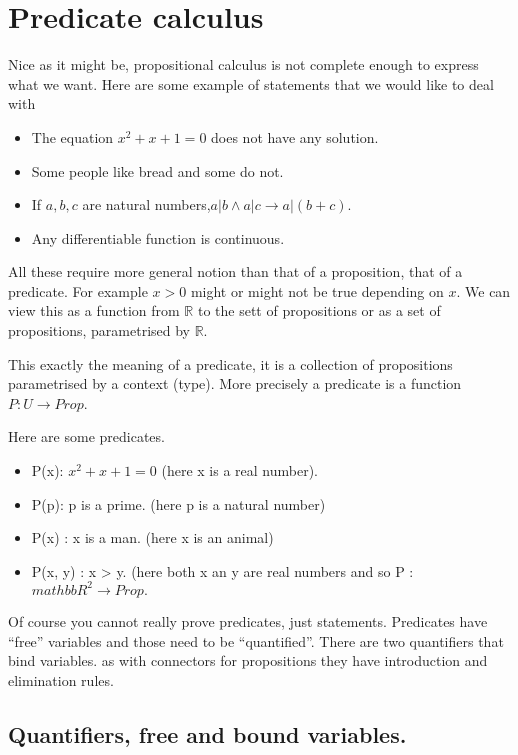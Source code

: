 \section{Predicate calculus}\label{sec:predicatecalculus}

Nice as it might be, propositional calculus is not complete enough to express what we want. Here are some example of statements that we would like to deal with
\begin{itemize}
\item The equation $x^2+x+1=0$ does not have any solution.
\item Some people like bread and some do not.
\item If $a,b, c$ are natural numbers,$a|b \land a | c \rightarrow a | (b+c)$.
\item Any differentiable function is continuous.
\end{itemize}

All these require more general notion than that of a proposition, that of a predicate. 
For example $x>0$ might or might not be true depending on $x$. We can view this as a function from $\mathbb{R}$ to the sett of propositions or as a set of propositions, parametrised by $\mathbb{R}$. 

This exactly the meaning of a predicate, it is a collection of propositions parametrised by a context (type). More precisely a predicate is a function $P: U \rightarrow Prop$. 

Here are some predicates.

\begin{itemize}
\item P(x): $x^{2}+x+1 =0$ (here x is a real number).
\item P(p): p is a prime. (here p is a natural number)
\item P(x) : x is a man. (here x is an animal)
\item P(x, y) : x > y. (here both x an y are real numbers and so P : $mathbb{R}^{2}\rightarrow Prop.$

\end{itemize}	

Of course you cannot really prove predicates, just statements. Predicates have ``free'' variables and those need to be ``quantified''. There are two quantifiers that bind variables. as with connectors for propositions they have introduction and elimination rules.

\subsection{\bf Quantifiers, free and bound variables.}

